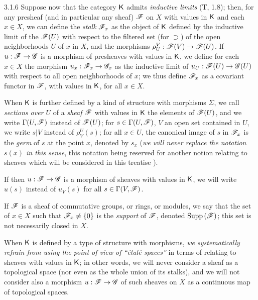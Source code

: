 \begin{env}{3.1.6}
\label{env-0.3.1.6}
Suppose now that the category $\mathsf{K}$ admits \emph{inductive limits} (T, 1.8);
then, for any presheaf (and in particular any sheaf) $\mathscr{F}$ on $X$ with values
in $\mathsf{K}$ and each $x\in X$, we can define the \emph{stalk} $\mathscr{F}_x$ as the
object of $\mathsf{K}$ defined by the inductive limit of the $\mathscr{F}(U)$ with respect to
the filtered set (for $\supset$) of the open neighborhoods $U$ of $x$ in $X$,
and the morphisms $\rho_U^V:\mathscr{F}(V)\to\mathscr{F}(U)$. If $u:\mathscr{F}\to\mathscr{G}$ is a
morphism of presheaves with values in $\mathsf{K}$, we define for each $x\in X$ the
morphism $u_x:\mathscr{F}_x\to\mathscr{G}_x$ as the inductive limit of
$u_U:\mathscr{F}(U)\to\mathscr{G}(U)$ with respect to all open neighborhoods of $x$; we
thus define $\mathscr{F}_x$ as a covariant functor in $\mathscr{F}$, with values in $\mathsf{K}$,
for all $x\in X$.

When $\mathsf{K}$ is further defined by a kind of structure with morphisms $\Sigma$, we
call \emph{sections over $U$} of a \emph{sheaf} $\mathscr{F}$ with values in $\mathsf{K}$ the
elements of $\mathscr{F}(U)$, and we write $\Gamma(U,\mathscr{F})$ instead of $\mathscr{F}(U)$;
for $s\in\Gamma(U,\mathscr{F})$, $V$ an open set contained in $U$, we write $s|V$
instead of $\rho_V^U(s)$; for all $x\in U$, the canonical image of $s$ in
$\mathscr{F}_x$ is the \emph{germ} of $s$ at the point $x$, denoted by $s_x$
(\emph{we will never replace the notation $s(x)$ in this sense}, this notation
being reserved for another notion relating to sheaves which will be considered
in this treatise ).

If then $u:\mathscr{F}\to\mathscr{G}$ is a morphism of sheaves with values in $\mathsf{K}$, we
will write $u(s)$ instead of $u_V(s)$ for all $s\in\Gamma(V,\mathscr{F})$.

If $\mathscr{F}$ is a sheaf of commutative groups, or rings, or modules, we say that
the set of $x\in X$ such that $\mathscr{F}_x\neq\{0\}$ is the \emph{support} of
$\mathscr{F}$, denoted ${\mathop{\mathrm{Supp}}\nolimits}\,(\mathscr{F})$; this set is not necessarily closed in $X$.

When $\mathsf{K}$ is defined by a type of structure with morphisms, \emph{we
systematically refrain from using the point of view of ``\'etal\'e spaces''} in
terms of relating to sheaves with values in $\mathsf{K}$; in other words, we will never
consider a sheaf as a topological space (nor even as the whole union of its
stalks), and we will not consider also a morphism $u:\mathscr{F}\to\mathscr{G}$ of such
sheaves on $X$ as a continuous map of topological spaces.
\end{env}

